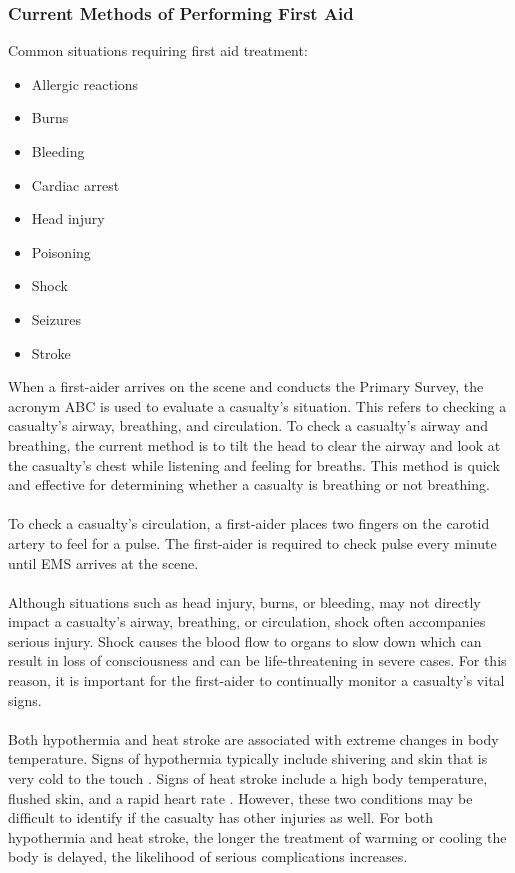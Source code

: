\documentclass{article}
\begin{document}
	\subsubsection{Current Methods of Performing First Aid}
	
	Common situations requiring first aid treatment:
	\begin{itemize}[noitemsep]
	    \item Allergic reactions
	    \item Burns
	    \item Bleeding
	    \item Cardiac arrest
	    \item Head injury
	    \item Poisoning
	    \item Shock 
	    \item Seizures
	    \item Stroke
	\end{itemize}
	
	When a first-aider arrives on the scene and conducts the Primary Survey, the acronym ABC is used to evaluate a casualty's situation. This refers to checking a casualty's airway, breathing, and circulation. To check a casualty's airway and breathing, the current method is to tilt the head to clear the airway and look at the casualty's chest while listening and feeling for breaths.  This method is quick and effective for determining whether a casualty is breathing or not breathing.    
	\paragraph{}
	To check a casualty's circulation, a first-aider places two fingers on the carotid artery to feel for a pulse.  The first-aider is required to check pulse every minute until EMS arrives at the scene.  
	\paragraph{}
	Although situations such as head injury, burns, or bleeding, may not directly impact a casualty's airway, breathing, or circulation, shock often accompanies serious injury. Shock causes the blood flow to organs to slow down which can result in loss of consciousness and can be life-threatening in severe cases.  For this reason, it is important for the first-aider to continually monitor a casualty's vital signs.  
	\paragraph{}
	Both hypothermia and heat stroke are associated with extreme changes in body temperature.  Signs of hypothermia typically include shivering and skin that is very cold to the touch \citep{hypothermia}.  Signs of heat stroke include a high body temperature, flushed skin, and a rapid heart rate \citep{heartrate}.  However, these two conditions may be difficult to identify if the casualty has other injuries as well.  For both hypothermia and heat stroke, the longer the treatment of warming or cooling the body is delayed, the likelihood of serious complications increases.
\end{document}
